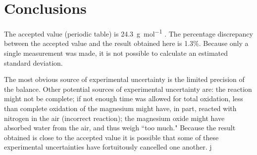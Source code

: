 \documentclass{article}
\begin{document}
\clearpage
\section{Conclusions}

The accepted value (periodic table) is \SI{24.3}{\gram\per\mole} \cite{Smith:2012qr}. The percentage discrepancy between the accepted value and the result obtained here is 1.3\%. Because only a single measurement was made, it is not possible to calculate an estimated standard deviation.

The most obvious source of experimental uncertainty is the limited precision of the balance. Other potential sources of experimental uncertainty are: the reaction might not be complete; if not enough time was allowed for total oxidation, less than complete oxidation of the magnesium might have, in part, reacted with nitrogen in the air (incorrect reaction); the magnesium oxide might have absorbed water from the air, and thus weigh ``too much." Because the result obtained is close to the accepted value it is possible that some of these experimental uncertainties have fortuitously cancelled one another.
j

 

 

 
\end{document}
